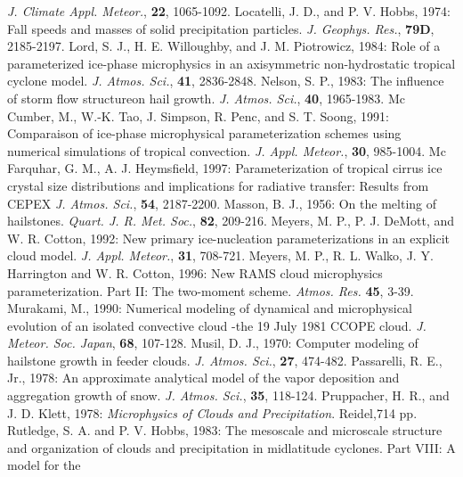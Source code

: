       {\it J. Climate Appl. Meteor.},
      {\bf 22},
      1065-1092.
\decrefname
Locatelli, J. D., and P. V. Hobbs, 1974:
      Fall speeds and masses of solid precipitation particles.
      {\it J. Geophys. Res.},
      {\bf 79D},
      2185-2197.
\decrefname
Lord, S. J., H. E. Willoughby, and J. M. Piotrowicz, 1984:
      Role of a parameterized ice-phase microphysics in an axisymmetric
      non-hydrostatic tropical  cyclone model.
      {\it J. Atmos. Sci.},
      {\bf 41},
      2836-2848.
\decrefname
Nelson, S. P., 1983:
      The influence of storm flow structureon hail growth.
      {\it J. Atmos. Sci.},
      {\bf 40},
      1965-1983.
\decrefname
Mc Cumber, M., W.-K. Tao, J. Simpson, R. Penc, and S. T. Soong, 1991:
      Comparaison of ice-phase microphysical parameterization schemes using
      numerical simulations of tropical convection.
      {\it J. Appl. Meteor.},
      {\bf 30},
      985-1004.
\decrefname
Mc Farquhar, G. M., A. J. Heymsfield, 1997:
      Parameterization of tropical cirrus ice crystal size distributions and
      implications for radiative transfer: Results from CEPEX
      {\it J. Atmos. Sci.},
      {\bf 54},
      2187-2200.
\decrefname
Masson, B. J., 1956:
      On the melting of hailstones.
      {\it Quart. J. R. Met. Soc.},
      {\bf 82},
      209-216.
\decrefname
Meyers, M. P., P. J. DeMott, and W. R. Cotton, 1992:
      New primary ice-nucleation parameterizations in an explicit cloud model.
      {\it J. Appl. Meteor.},
      {\bf 31},
      708-721.
\decrefname
Meyers, M. P., R. L. Walko, J. Y. Harrington and W. R. Cotton, 1996:
      New RAMS cloud microphysics parameterization. Part II: The two-moment
      scheme.
      {\it Atmos. Res.}
      {\bf 45},
      3-39.
\decrefname
Murakami, M., 1990:
      Numerical modeling of dynamical and microphysical evolution of an isolated
      convective cloud -the 19 July 1981 CCOPE cloud.
      {\it J. Meteor. Soc. Japan},
      {\bf 68},
      107-128.
\decrefname
Musil, D. J., 1970:
      Computer modeling of hailstone growth in feeder clouds.
      {\it J. Atmos. Sci.},
      {\bf 27},
      474-482.
\decrefname
Passarelli, R. E., Jr., 1978:
      An approximate analytical model of the vapor deposition and aggregation
      growth of snow.
      {\it J. Atmos. Sci.},
      {\bf 35},
      118-124.
\decrefname
Pruppacher, H. R., and J. D. Klett, 1978:
      {\it Microphysics of Clouds and Precipitation}.
      Reidel,714 pp.
\decrefname
Rutledge, S. A. and P. V. Hobbs, 1983:
      The mesoscale and microscale structure and organization of clouds and
      precipitation in midlatitude cyclones. Part VIII: A model for the
